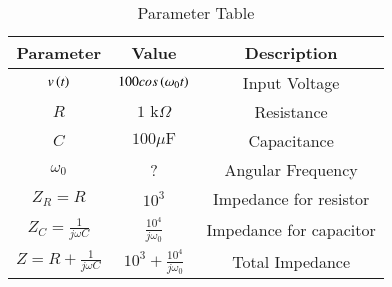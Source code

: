 \begin{table}[ht]
	  \centering
	    \begin{tabular}{|c|c|c|}
		        \hline
			   \textbf{ Parameter} & \textbf{Value} & \textbf{Description} \\
			       \hline
			           $v\left(t\right)$ & $100cos\left(\omega_0 t\right)$ & Input Voltage \\
				       \hline
				           $R$ & $1\text{ k}\Omega$ & Resistance \\
					       \hline
					           $C$ & $100\mu\text{F}$ & Capacitance \\
						       \hline
						           $\omega_0$ & ? & Angular Frequency  \\
							       \hline
							           $Z_R = R$ & $10^3$ & Impedance for resistor  \\
								       \hline
								           $Z_C = \frac{1}{j\omega C}$ & $\frac{10^{4}}{j\omega_0}$ & Impedance for capacitor  \\
									       \hline
									           $Z = R + \frac{1}{j\omega C}$ & $10^3 + \frac{10^4}{j\omega_0}$ & Total Impedance \\
										       \hline
										         \end{tabular}
											   \vspace{2mm}
											     \caption{Parameter Table}
											       \label{BM_23_32}
\end{table}

